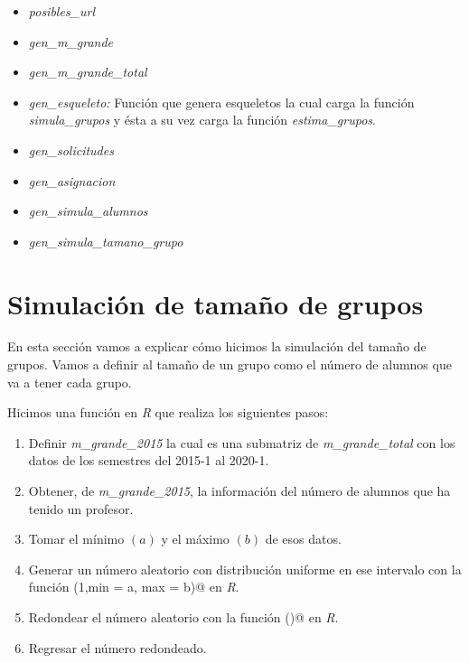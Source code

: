 \begin{itemize}
\item \textit{posibles\_url}

\item \textit{gen\_m\_grande}

\item \textit{gen\_m\_grande\_total}

\item \textit{gen\_esqueleto: } Función que genera esqueletos la cual carga la función \textit{simula\_grupos} y ésta a su vez carga la función \textit{estima\_grupos}.

\item \textit{gen\_solicitudes}

\item \textit{gen\_asignacion}

\item \textit{gen\_simula\_alumnos}

\item \textit{gen\_simula\_tamano\_grupo}
\end{itemize}



\section{Simulación de tamaño de grupos} \label{SimTamGpos}

En esta sección vamos a explicar cómo hicimos la simulación del tamaño de grupos. Vamos a definir al tamaño de un grupo como el número de alumnos que va a tener cada grupo.

Hicimos una función en \textit{R} que realiza los siguientes pasos:

\begin{enumerate}
\item Definir \textit{m\_grande\_2015} la cual es una submatriz de \textit{m\_grande\_total} con los datos de los semestres del 2015-1 al 2020-1.

\item Obtener, de \textit{m\_grande\_2015}, la información del número de alumnos que ha tenido un profesor.

\item Tomar el mínimo $(a)$ y el máximo $(b)$ de esos datos.

\item Generar un número aleatorio con distribución uniforme en ese intervalo con la función \verb@runif(1,min = a, max = b)@ en \textit{R}.

\item Redondear el número aleatorio con la función \verb@ceiling()@ en \textit{R}.

\item Regresar el número redondeado.
\end{enumerate}

